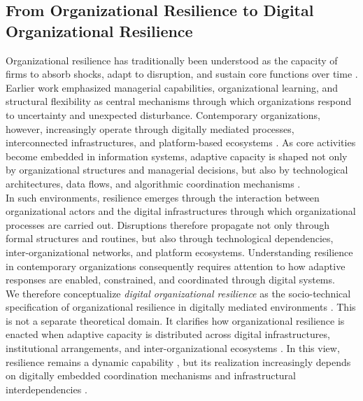 \subsection{From Organizational Resilience to Digital Organizational Resilience}

Organizational resilience has traditionally been understood as the capacity of firms to absorb shocks, adapt to disruption, and sustain core functions over time \autocite{duchek2020organizational,burnard2011organisational}. Earlier work emphasized managerial capabilities, organizational learning, and structural flexibility as central mechanisms through which organizations respond to uncertainty and unexpected disturbance. Contemporary organizations, however, increasingly operate through digitally mediated processes, interconnected infrastructures, and platform-based ecosystems \autocite{hepfer2022heterogeneity,gillard2023efficient}. As core activities become embedded in information systems, adaptive capacity is shaped not only by organizational structures and managerial decisions, but also by technological architectures, data flows, and algorithmic coordination mechanisms \autocite{liu2022network}.\\

In such environments, resilience emerges through the interaction between organizational actors and the digital infrastructures through which organizational processes are carried out. Disruptions therefore propagate not only through formal structures and routines, but also through technological dependencies, inter-organizational networks, and platform ecosystems. Understanding resilience in contemporary organizations consequently requires attention to how adaptive responses are enabled, constrained, and coordinated through digital systems.\\

We therefore conceptualize \emph{digital organizational resilience} as the socio-technical specification of organizational resilience in digitally mediated environments \autocite{duchek2020organizational,hepfer2022heterogeneity}. This is not a separate theoretical domain. It clarifies how organizational resilience is enacted when adaptive capacity is distributed across digital infrastructures, institutional arrangements, and inter-organizational ecosystems \autocite{janssen2006network,liu2022network}. In this view, resilience remains a dynamic capability \autocite{duchek2020organizational}, but its realization increasingly depends on digitally embedded coordination mechanisms and infrastructural interdependencies \autocite{boin2013resilient,linkov2013resilience}.


